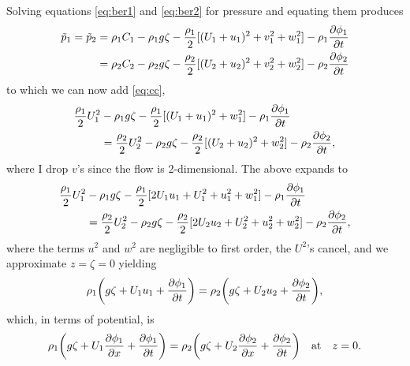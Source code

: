 \documentclass[10pt]{article}
\begin{document}
Solving equations \eqref{eq:ber1} and \eqref{eq:ber2} for pressure and equating them produces
\begin{align}
    \begin{split}
        \tilde p_1 = \tilde p_2 & = \rho_1C_1 - \rho_1g\zeta - \frac{\rho_1}{2}[(U_1 + u_1)^2 + v_1^2 + w_1^2] - \rho_1\pdv{\phi_1}{t} \\
                                & = \rho_2C_2 - \rho_2g\zeta - \frac{\rho_2}{2}[(U_2 + u_2)^2 + v_2^2 + w_2^2] - \rho_2\pdv{\phi_2}{t}
    \end{split}
\end{align}
to which we can now add \eqref{eq:cc},
\begin{align}
    \begin{split}
        \frac{\rho_1}{2}U_1^2 & - \rho_1g\zeta - \frac{\rho_1}{2}[(U_1 + u_1)^2 + w_1^2] - \rho_1\pdv{\phi_1}{t} \\
                              & = \frac{\rho_2}{2}U_2^2 - \rho_2g\zeta - \frac{\rho_2}{2}[(U_2 + u_2)^2 + w_2^2] - \rho_2\pdv{\phi_2}{t},
    \end{split}
\end{align}
where I drop $v$'s since the flow is 2-dimensional. The above expands to
\begin{align}
    \begin{split}
        \frac{\rho_1}{2}U_1^2 & - \rho_1g\zeta - \frac{\rho_1}{2}[2U_1u_1 + U_1^2 + u_1^2 + w_1^2] - \rho_1\pdv{\phi_1}{t} \\
                              & = \frac{\rho_2}{2}U_2^2 - \rho_2g\zeta - \frac{\rho_2}{2}[2U_2u_2 + U_2^2 + u_2^2 + w_2^2] - \rho_2\pdv{\phi_2}{t},
    \end{split}
\end{align}
where the terms $u^2$ and $w^2$ are negligible to first order, the $U^2$'s cancel, and we approximate $z = \zeta = 0$ yielding
\begin{align}
    \rho_1\qty(g\zeta + U_1u_1 + \pdv{\phi_1}{t}) = \rho_2\qty(g\zeta + U_2u_2 + \pdv{\phi_2}{t}),
\end{align}
which, in terms of potential, is
\begin{align}
    \rho_1\qty(g\zeta + U_1\pdv{\phi_1}{x} + \pdv{\phi_1}{t}) = \rho_2\qty(g\zeta + U_2\pdv{\phi_2}{x} + \pdv{\phi_2}{t}) \qq{at} z = 0 \label{eq:ber3}.
\end{align}
\end{document}
